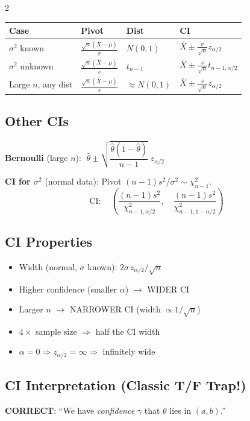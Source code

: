 \documentclass[8pt]{extarticle}
\begin{document}
\begin{multicols}{2}
\begin{tabular}{@{}llll@{}}
\toprule
\textbf{Case} & \textbf{Pivot} & \textbf{Dist} & \textbf{CI} \\
\midrule
$\sigma^2$ known & $\frac{\sqrt{n}(\bar X-\mu)}{\sigma}$ & $N(0,1)$ & $\bar X \pm \frac{\sigma}{\sqrt{n}}z_{\alpha/2}$ \\[6pt]
$\sigma^2$ unknown & $\frac{\sqrt{n}(\bar X-\mu)}{s}$ & $t_{n-1}$ & $\bar X \pm \frac{s}{\sqrt{n}}t_{n-1,\alpha/2}$ \\[6pt]
Large $n$, any dist & $\frac{\sqrt{n}(\bar X-\mu)}{s}$ & $\approx N(0,1)$ & $\bar X \pm \frac{s}{\sqrt{n}}z_{\alpha/2}$ \\
\bottomrule
\end{tabular}

\subsection{Other CIs}

\textbf{Bernoulli} (large $n$): $\;\hat\theta \pm \sqrt{\dfrac{\hat\theta(1-\hat\theta)}{n-1}}\; z_{\alpha/2}$

\textbf{CI for $\sigma^2$} (normal data): Pivot $(n{-}1)s^2/\sigma^2 \sim \chi^2_{n-1}$.
$$\text{CI}: \quad \left(\frac{(n-1)s^2}{\chi^2_{n-1,\alpha/2}},\quad \frac{(n-1)s^2}{\chi^2_{n-1,1-\alpha/2}}\right)$$

\subsection{CI Properties}

\begin{itemize}
\item Width (normal, $\sigma$ known): $2\sigma\, z_{\alpha/2}/\sqrt{n}$
\item Higher confidence (smaller $\alpha$) $\to$ WIDER CI
\item Larger $n$ $\to$ NARROWER CI (width $\propto 1/\sqrt{n}$)
\item $4\times$ sample size $\Rightarrow$ half the CI width
\item $\alpha = 0 \Rightarrow z_{\alpha/2} = \infty \Rightarrow$ infinitely wide
\end{itemize}

\subsection{CI Interpretation (Classic T/F Trap!)}

\textbf{CORRECT}: ``We have \emph{confidence} $\gamma$ that $\theta$ lies in $(a,b)$.''


\end{multicols}
\end{document}
